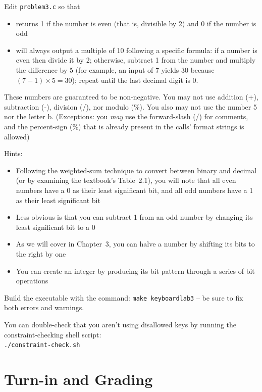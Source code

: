 Edit \texttt{problem3.c} so that
\begin{itemize}
\item {} returns 1 if the number is even (that is,
    divisible by 2) and 0 if the number is odd
\item {} will always output a multiple of
    10 following a specific formula: if a number is even then divide it by
    2; otherwise, subtract 1 from the number and multiply the difference
    by 5 (for example, an input of 7 yields 30 because $(7-1) \times 5 = 30$);
    repeat until the last decimal digit is 0.
\end{itemize}
These numbers are guaranteed to be non-negative. You may not use addition (+),
subtraction (-), division (/), nor modulo (\%). You also may not use the
number 5 nor the letter b. (Exceptions: you \textit{may} use the forward-slash
(/) for comments, and the percent-sign (\%) that is already present in the
 calls' format strings is allowed)

Hints:
\begin{itemize}
\item Following the weighted-sum technique to convert between binary and
    decimal (or by examining the textbook's Table~2.1), you will note that all
    even numbers have a 0 as their least significant bit, and all odd numbers
    have a 1 as their least significant bit
\item Less obvious is that you can subtract 1 from an odd number by changing
    its least significant bit to a 0
\item As we will cover in Chapter~3, you can halve a number by shifting its
    bits to the right by one
\item You can create an integer by producing its bit pattern through a series
    of bit operations
\end{itemize}

Build the executable with the command: \texttt{make keyboardlab3} -- be sure to
fix both errors and warnings.

You can double-check that you aren't using disallowed keys by running the
constraint-checking shell script: \\
\texttt{./constraint-check.sh} \\


\section*{Turn-in and Grading}

